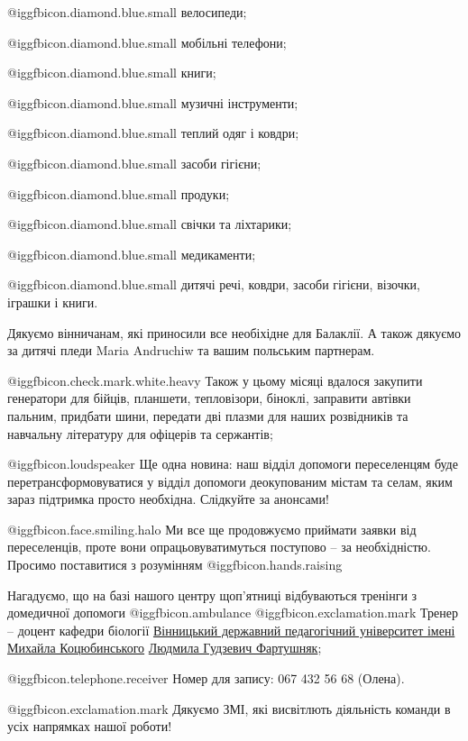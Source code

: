 @igg{fbicon.diamond.blue.small} ️велосипеди; \par
@igg{fbicon.diamond.blue.small} ️мобільні телефони;\par
@igg{fbicon.diamond.blue.small} ️книги;\par
@igg{fbicon.diamond.blue.small} ️музичні інструменти;\par
@igg{fbicon.diamond.blue.small} ️теплий одяг і ковдри;\par
@igg{fbicon.diamond.blue.small} ️засоби гігієни;\par
@igg{fbicon.diamond.blue.small} ️продуки;\par
@igg{fbicon.diamond.blue.small} ️свічки та ліхтарики; \par
@igg{fbicon.diamond.blue.small} ️медикаменти;\par
@igg{fbicon.diamond.blue.small} ️дитячі речі, ковдри, засоби гігієни, візочки, іграшки і книги.\par

Дякуємо вінничанам, які приносили все необіхідне для Балаклії. А також дякуємо
за дитячі пледи Maria Andruchiw та вашим польським партнерам.

@igg{fbicon.check.mark.white.heavy} ️Також у цьому місяці вдалося закупити генератори для бійців, планшети,
тепловізори, біноклі, заправити автівки пальним, придбати шини, передати дві
плазми для наших розвідників та навчальну літературу для офіцерів та сержантів; 

@igg{fbicon.loudspeaker}  Ще одна новина: наш відділ допомоги переселенцям буде перетрансформовуватися
у відділ допомоги деокупованим містам та селам, яким зараз підтримка просто
необхідна. Слідкуйте за анонсами! 

@igg{fbicon.face.smiling.halo} Ми все ще продовжуємо приймати заявки від переселенців, проте вони
опрацьовуватимуться поступово – за необхідністю. Просимо поставитися з
розумінням @igg{fbicon.hands.raising} 

Нагадуємо, що на базі нашого центру щоп'ятниці відбуваються тренінги з
домедичної допомоги @igg{fbicon.ambulance}
@igg{fbicon.exclamation.mark} ️Тренер – доцент кафедри біології
\href{https://www.facebook.com/vspu.edu.ua}{Вінницький державний педагогічний
університет імені Михайла Коцюбинського}
\href{https://www.facebook.com/gudzevichl}{Людмила Гудзевич Фартушняк}; 

@igg{fbicon.telephone.receiver}  Номер для запису: 067 432 56 68 (Олена).

@igg{fbicon.exclamation.mark} Дякуємо ЗМІ, які висвітлють діяльність команди в
усіх напрямках нашої роботи!

